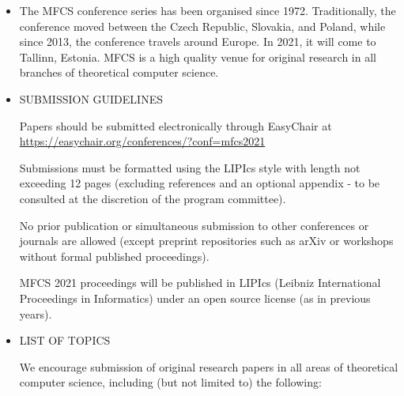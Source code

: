 \documentclass{article}
\begin{document}
\begin{itemize}\item  The MFCS conference series has been organised since 1972. Traditionally, the conference moved between the Czech Republic, Slovakia, and Poland, while since 2013, the conference travels around Europe. In 2021, it will come to Tallinn, Estonia. MFCS is a high quality venue for original research in all branches of theoretical computer science. 
 
\item  SUBMISSION GUIDELINES 
 
  Papers should be submitted electronically through EasyChair at \href{https://easychair.org/conferences/?conf=mfcs2021}{https://easychair.org/conferences/?conf=mfcs2021} 
 
  Submissions must be formatted using the LIPIcs style with length not exceeding 12 pages (excluding references and an optional appendix - to be consulted at the discretion of the program committee).  
 
  No prior publication or simultaneous submission to other conferences or journals are allowed (except preprint repositories such as arXiv or workshops without formal published proceedings). 
 
  MFCS 2021 proceedings will be published in LIPIcs (Leibniz International Proceedings in Informatics) under an open source license (as in previous years). 
 
\item  LIST OF TOPICS 
 
  We encourage submission of original research papers in all areas of theoretical computer science, including (but not limited to) the following: 
 

\end{itemize}
\end{document}
